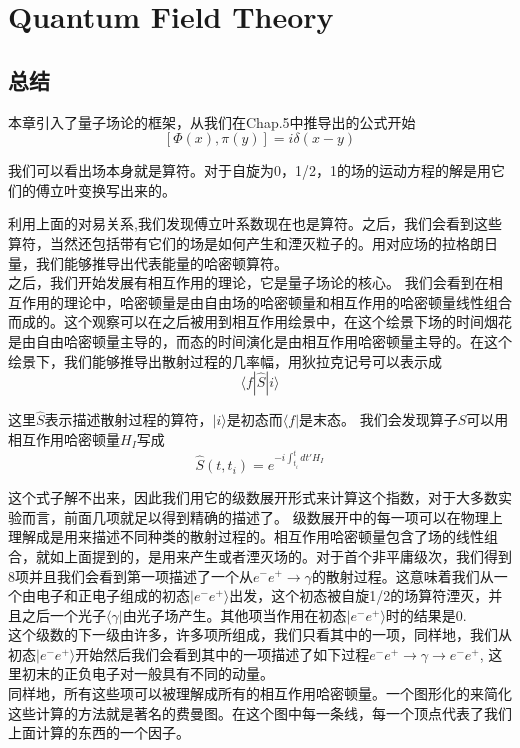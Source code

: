 




\chapter[量子场论]{Quantum Field Theory }
\label{chap9}

\section*{总结}
本章引入了量子场论的框架，从我们在Chap.5中推导出的公式开始
$$[\Phi(x),\pi(y)]=i\delta(x-y)$$

我们可以看出场本身就是算符。对于自旋为0，1/2，1的场的运动方程的解是用它们的傅立叶变换写出来的。

利用上面的对易关系,我们发现傅立叶系数现在也是算符。之后，我们会看到这些算符，当然还包括带有它们的场是如何产生和湮灭粒子的。用对应场的拉格朗日量，我们能够推导出代表能量的哈密顿算符。\\
之后，我们开始发展有相互作用的理论，它是量子场论的核心。 我们会看到在相互作用的理论中，哈密顿量是由自由场的哈密顿量和相互作用的哈密顿量线性组合而成的。这个观察可以在之后被用到相互作用绘景中，在这个绘景下场的时间烟花是由自由哈密顿量主导的，而态的时间演化是由相互作用哈密顿量主导的。在这个绘景下，我们能够推导出散射过程的几率幅，用狄拉克记号可以表示成
$$\langle f | \hat{S} | i\rangle$$

这里$\hat{S}$表示描述散射过程的算符，$|i\rangle$是初态而$\langle f|$是末态。 我们会发现算子$\hat{S}$可以用相互作用哈密顿量$H_{I}$写成
$$\hat{S}(t,t_{i})=e^{-i\int_{t_{i}}^{t} dt' H_{I}}$$

这个式子解不出来，因此我们用它的级数展开形式来计算这个指数，对于大多数实验而言，前面几项就足以得到精确的描述了。
级数展开中的每一项可以在物理上理解成是用来描述不同种类的散射过程的。相互作用哈密顿量包含了场的线性组合，就如上面提到的，是用来产生或者湮灭场的。对于首个非平庸级次，我们得到8项并且我们会看到第一项描述了一个从$e^{-} e^{+} \to \gamma$的散射过程。这意味着我们从一个由电子和正电子组成的初态$|e^{-}e^{+} \rangle$出发，这个初态被自旋1/2的场算符湮灭，并且之后一个光子$\langle \gamma |$由光子场产生。其他项当作用在初态$|e^{-}e^{+} \rangle$时的结果是0.\\
这个级数的下一级由许多，许多项所组成，我们只看其中的一项，同样地，我们从初态$|e^{-}e^{+} \rangle$开始然后我们会看到其中的一项描述了如下过程$e^{-}e^{+} \to \gamma \to e^{-}e^{+}$, 这里初末的正负电子对一般具有不同的动量。\\
同样地，所有这些项可以被理解成所有的相互作用哈密顿量。一个图形化的来简化这些计算的方法就是著名的费曼图。在这个图中每一条线，每一个顶点代表了我们上面计算的东西的一个因子。
